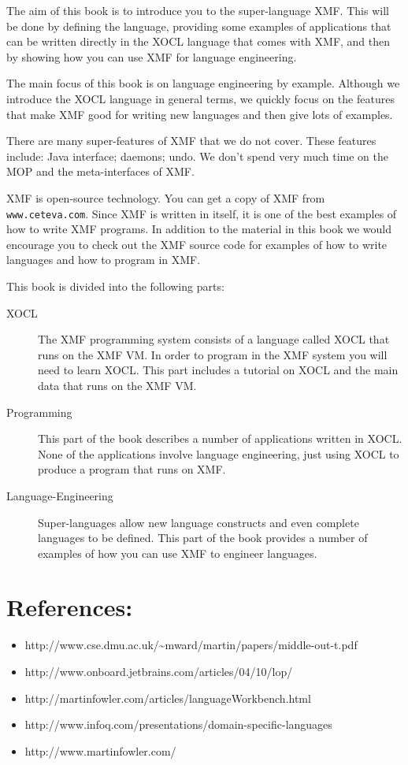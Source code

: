 The aim of this book is to introduce you to the super-language XMF.
This will be done by defining the language, providing some examples of
applications that can be written directly in the XOCL language that
comes with XMF, and then by showing how you can use XMF for language
engineering.

The main focus of this book is on language engineering by example.
Although we introduce the XOCL language in general terms, we quickly focus
on the features that make XMF good for writing new languages and then
give lots of examples.

There are many super-features of XMF that we do not cover. These features include:
Java interface; daemons; undo. We don't spend very much time on the
MOP and the meta-interfaces of XMF. 

XMF is open-source technology. You can get a copy of XMF from {\tt www.ceteva.com}.
Since XMF is written in itself, it is one of the best examples of 
how to write XMF programs. In addition to the material in this book
we would encourage you to check out the XMF source code for examples
of how to write languages and how to program in XMF. 

This book is divided into the following parts:

\begin{description}
\item [{XOCL}] The XMF programming system consists of a
language called XOCL that runs on the XMF VM. In order to program
in the XMF system you will need to learn XOCL. This part includes
a tutorial on XOCL and the main data that runs on the XMF VM.
\item [{Programming}] This part of the book describes a number of
applications written in XOCL. None of the applications involve language
engineering, just using XOCL to produce a program that runs on XMF.
\item [{Language-Engineering}] Super-languages allow new language constructs
and even complete languages to be defined. This part of the book provides
a number of examples of how you can use XMF to engineer languages.
\end{description}

\section{References:}

\begin{itemize}
\item http://www.cse.dmu.ac.uk/\textasciitilde{}mward/martin/papers/middle-out-t.pdf
\item http://www.onboard.jetbrains.com/articles/04/10/lop/
\item http://martinfowler.com/articles/languageWorkbench.html
\item http://www.infoq.com/presentations/domain-specific-languages
\item http://www.martinfowler.com/
\end{itemize}
